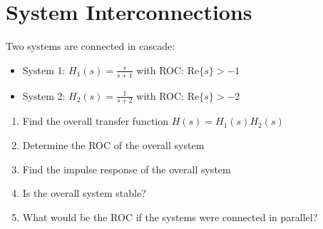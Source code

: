 \documentclass{article}
\begin{document}
\section{System Interconnections}
Two systems are connected in cascade:
\begin{itemize}
    \item System 1: $H_1(s) = \frac{s}{s + 1}$ with ROC: $\text{Re}\{s\} > -1$
    \item System 2: $H_2(s) = \frac{1}{s + 2}$ with ROC: $\text{Re}\{s\} > -2$
\end{itemize}
\begin{enumerate}[label=(\alph*)]
    \item Find the overall transfer function $H(s) = H_1(s)H_2(s)$
    \item Determine the ROC of the overall system
    \item Find the impulse response of the overall system
    \item Is the overall system stable?
    \item What would be the ROC if the systems were connected in parallel?
\end{enumerate}
\end{document}
